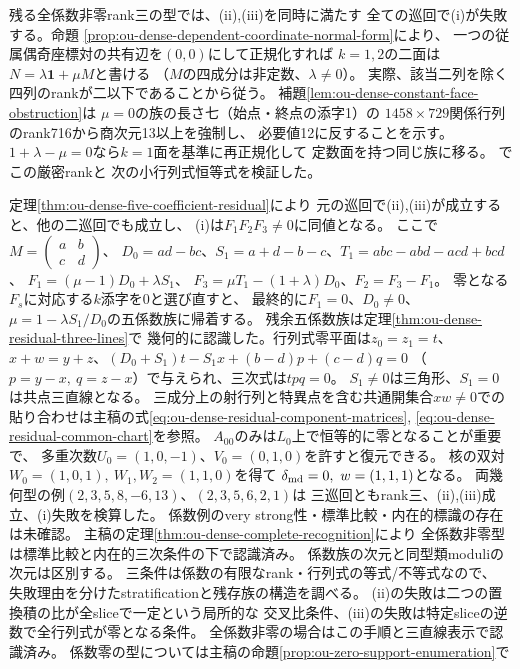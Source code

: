 \documentclass[11pt,a4paper]{ltjsarticle}
\begin{document}
残る全係数非零rank三の型では、(ii),(iii)を同時に満たす
全ての巡回で(i)が失敗する。命題
\ref{prop:ou-dense-dependent-coordinate-normal-form}により、
一つの従属偶奇座標対の共有辺を$(0,0)$にして正規化すれば
$k=1,2$の二面は$N=\lambda\mathbf1+\mu M$と書ける
（$M$の四成分は非定数、$\lambda\ne0$）。
実際、該当二列を除く四列のrankが二以下であることから従う。
補題\ref{lem:ou-dense-constant-face-obstruction}は
$\mu=0$の族の長さ七（始点・終点の添字1）の
$1458\times729$関係行列のrank716から商次元13以上を強制し、
必要値12に反することを示す。
$1+\lambda-\mu=0$なら$k=1$面を基準に再正規化して
定数面を持つ同じ族に移る。
でこの厳密rankと
次の小行列式恒等式を検証した。

定理\ref{thm:ou-dense-five-coefficient-residual}により
元の巡回で(ii),(iii)が成立すると、他の二巡回でも成立し、
(i)は$F_1F_2F_3\ne0$に同値となる。
ここで$M=\left(\begin{smallmatrix}a&b\\c&d\end{smallmatrix}\right)$、
$D_0=ad-bc$、$S_1=a+d-b-c$、$T_1=abc-abd-acd+bcd$、
$F_1=(\mu-1)D_0+\lambda S_1$、
$F_3=\mu T_1-(1+\lambda)D_0$、$F_2=F_3-F_1$。
零となる$F_s$に対応する$k$添字を0と選び直すと、
最終的に$F_1=0$、$D_0\ne0$、
$\mu=1-\lambda S_1/D_0$の五係数族に帰着する。
残余五係数族は定理\ref{thm:ou-dense-residual-three-lines}で
幾何的に認識した。行列式零平面は$z_0=z_1=t$、
$x+w=y+z$、$(D_0+S_1)t-S_1x+(b-d)p+(c-d)q=0$
（$p=y-x,\ q=z-x$）で与えられ、三次式は$tpq=0$。
$S_1\ne0$は三角形、$S_1=0$は共点三直線となる。
三成分上の射行列と特異点を含む共通開集合$xw\ne0$での
貼り合わせは主稿の式\eqref{eq:ou-dense-residual-component-matrices},
\eqref{eq:ou-dense-residual-common-chart}を参照。
$A_{00}$のみは$L_0$上で恒等的に零となることが重要で、
多重次数$U_0=(1,0,-1)$、$V_0=(0,1,0)$を許すと復元できる。
核の双対$W_0=(1,0,1),\ W_1,W_2=(1,1,0)$を得て
$\delta_{\rm md}=0,\ w=(1,1,1)$となる。
両幾何型の例$(2,3,5,8,-6,13)$、$(2,3,5,6,2,1)$は
三巡回ともrank三、(ii),(iii)成立、(i)失敗を検算した。
係数例のvery strong性・標準比較・内在的標識の存在は未確認。
主稿の定理\ref{thm:ou-dense-complete-recognition}により
全係数非零型は標準比較と内在的三次条件の下で認識済み。
係数族の次元と同型類moduliの次元は区別する。
三条件は係数の有限なrank・行列式の等式/不等式なので、
失敗理由を分けたstratificationと残存族の構造を調べる。
(ii)の失敗は二つの置換積の比が全sliceで一定という局所的な
交叉比条件、(iii)の失敗は特定sliceの逆数で全行列式が零となる条件。
全係数非零の場合はこの手順と三直線表示で認識済み。
係数零の型については主稿の命題\ref{prop:ou-zero-support-enumeration}で
\end{document}
